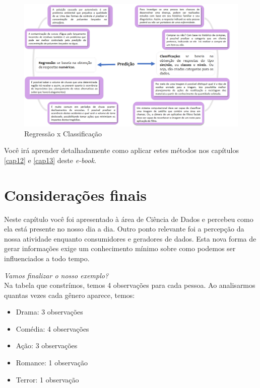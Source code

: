 \documentclass[
  portuguese,
  oneside]{book}
\providecommand{\tightlist}{%
  \setlength{\itemsep}{0pt}\setlength{\parskip}{0pt}}
\begin{document}
\begin{figure}

{\centering \includegraphics[width=1\linewidth]{fig_cap1/reg_class} 

}

\caption{Regressão x Classificação}\label{fig:figura8}
\end{figure}

Você irá aprender detalhadamente como aplicar estes métodos nos capítulos \ref{cap12} e \ref{cap13} deste \emph{e-book}.

\hypertarget{considerauxe7uxf5es-finais}{%
\section{Considerações finais}\label{considerauxe7uxf5es-finais}}

Neste capítulo você foi apresentado à área de Ciência de Dados e percebeu como ela está presente no nosso dia a dia. Outro ponto relevante foi a percepção da nossa atividade enquanto consumidores e geradores de dados. Esta nova forma de gerar informações exige um conhecimento mínimo sobre como podemos ser influenciados a todo tempo.

\emph{Vamos finalizar o nosso exemplo?}\\
Na tabela que constrímos, temos 4 observações para cada pessoa. Ao analisarmos quantas vezes cada gênero aparece, temos:

\begin{itemize}
\tightlist
\item
  Drama: 3 observações
\item
  Comédia: 4 observações
\item
  Ação: 3 observações
\item
  Romance: 1 observação
\item
  Terror: 1 observação
\end{itemize}
\end{document}
